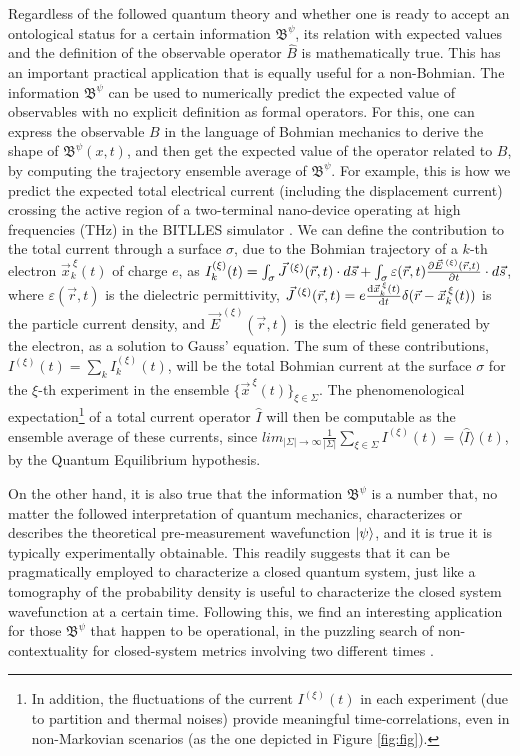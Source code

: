 \documentclass[11pt, a4paper]{article} %
\newcommand{\B}{\mathfrak{B}}
\begin{document}
Regardless of the followed quantum theory and whether one is ready to accept an ontological status for a certain information $\B^\psi$, its relation with expected values and the definition of the observable operator $\hat{B}$ is mathematically true. This has an important practical application that is equally useful for a non-Bohmian. The information $\B^\psi$ can be used to numerically predict the expected value of observables with no explicit definition as formal operators. For this, one can express the observable $B$ in the language of Bohmian mechanics to derive the shape of $\B^\psi(x,t)$, and then get the expected value of the operator related to $B$, by computing the trajectory ensemble average of $\B^\psi$. For example, this is how we predict the expected total electrical current (including the displacement current) crossing the active region of a two-terminal nano-device operating at high frequencies (THz) in the BITLLES simulator \cite{equiv, Pel}. We can define the contribution to the total current through a surface $\sigma$, due to the Bohmian trajectory of a $k$-th electron $\vec{x}_k^{\:\xi}(t)$ of charge $e$, as $I_k^{(\xi)}(t)=\int_\sigma \vec{J}^{\:(\xi)}(\vec{r},t)\cdot d\vec{s}+\int_\sigma \varepsilon(\vec{r},t)\pdv{\vec{E}^{\:(\xi)}(\vec{r},t)}{t}\cdot d\vec{s}$, where $\varepsilon(\vec{r},t)$ is the dielectric permittivity, $\vec{J}^{\:(\xi)}(\vec{r},t)=e\dv{\vec{x}_k^{\:\xi}(t)}{t}\delta(\vec{r}-\vec{x}_k^{\:\xi}(t))$ is the particle current density, and $\vec{E}^{\:(\xi)}(\vec{r},t)$ is the electric field generated by the electron, as a solution to Gauss' equation. The sum of these contributions, $I^{(\xi)}(t)=\sum_k I^{(\xi)}_k(t)$, will be the total Bohmian current at the surface $\sigma$ for the $\xi$-th experiment in the ensemble $\{\vec{x}^{\:\xi}(t)\}_{\xi\in \Sigma}$. The phenomenological expectation\footnote{In addition, the fluctuations of the current $I^{(\xi)}(t)$ in each experiment (due to partition and thermal noises) provide meaningful time-correlations, even in non-Markovian scenarios (as the one depicted in Figure \ref{fig:fig}).} of a total current operator $\hat{I}$ will then be computable as the ensemble average of these currents, since $lim_{|\Sigma|\rightarrow \infty}\frac{1}{|\Sigma|} \sum_{\xi\in\Sigma} I^{(\xi)}(t)=\langle \hat{I}\rangle(t)$, by the Quantum Equilibrium hypothesis.

On the other hand, it is also true that the information $\B^\psi$ is a number that, no matter the followed interpretation of quantum mechanics, characterizes or describes the theoretical pre-measurement wavefunction $\ket{\psi}$, and it is true it is typically experimentally obtainable. This readily suggests that it can be pragmatically employed to characterize a closed quantum system, just like a tomography of the probability density is useful to characterize the closed system wavefunction at a certain time. Following this, we find an interesting application for those $\B^\psi$ that happen to be operational, in the puzzling search of non-contextuality for closed-system metrics involving two different times \cite{DevInPosition1}.
\end{document}
